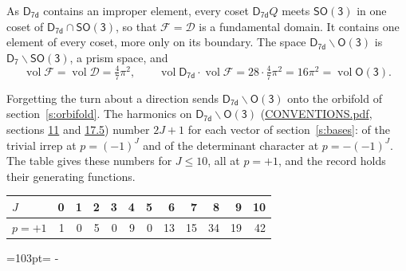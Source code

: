 \documentclass[10pt,a4paper]{article}
\newcommand{\needspace}[1]{\par\penalty-100\begingroup\dimen0=#1\relax\dimen2=\pagegoal
  \advance\dimen2-\pagetotal\ifdim\dimen0>\dimen2\relax\ifdim\dimen2>0pt\vfil\break\fi\fi
  \endgroup}
\numberwithin{equation}{section}
\newcommand{\grp}[1]{\mathsf{#1}}
\newcommand{\vol}{\operatorname{vol}}
\newcommand{\fcell}{\mathcal{D}}
\newcommand{\fdomain}{\mathcal{F}}
\begin{document}
\leavevmode\label{n:set.fundamental}As $\grp{D_{7d}}$ contains an improper element, every coset $\grp{D_{7d}}Q$ meets \href{SO3.pdf}{$\grp{SO(3)}$} in one coset of $\grp{D_{7d}} \cap \grp{SO(3)}$, so that $\fdomain = \fcell$ is a fundamental domain. It contains one element of every coset, more only on its boundary.
The space $\grp{D_{7d}}\backslash\grp{O(3)}$ is $\grp{D_{7}}\backslash\grp{SO(3)}$, a prism space, and
\begin{equation}\label{e:volume}\vol\fdomain = \vol\fcell = \tfrac{4}{7}\pi^2,\qquad \vol\grp{D_{7d}}\cdot\vol\fdomain = 28\cdot \tfrac{4}{7}\pi^2 = 16\pi^2 = \vol\grp{O(3)}.\end{equation}

Forgetting the turn about a direction sends $\grp{D_{7d}}\backslash\grp{O(3)}$ onto the orbifold of section~\ref{s:orbifold}.
The harmonics on $\grp{D_{7d}}\backslash\grp{O(3)}$ (\href{../../CONVENTIONS.pdf}{CONVENTIONS.pdf}, sections \href{../../CONVENTIONS.pdf\#conv.11}{11} and \href{../../CONVENTIONS.pdf\#conv.17.5}{17.5}) number $2J + 1$ for each vector of section~\ref{s:bases}: of the trivial irrep at $p = (-1)^J$ and of the determinant character at $p = -(-1)^J$. The table gives these numbers for $J \le 10$, all at $p = +1$, and the record holds their generating functions.
{\small\setlength{\tabcolsep}{4pt}\begin{longtable}{@{}lrrrrrrrrrrr@{}}\toprule
$J$ & 0 & 1 & 2 & 3 & 4 & 5 & 6 & 7 & 8 & 9 & 10\\\midrule\endhead
\bottomrule\endfoot\endlastfoot
$p = +1$ & 1 & 0 & 5 & 0 & 9 & 0 & 13 & 15 & 34 & 19 & 42\\
\bottomrule\end{longtable}}
\needspace{103pt}
\end{document}
